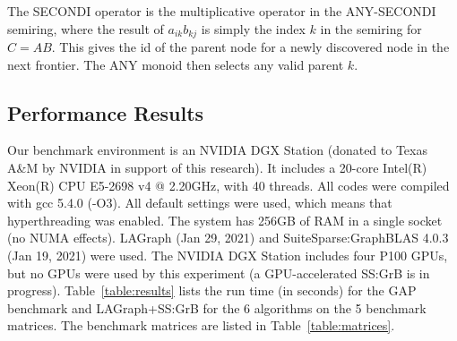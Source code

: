 The SECONDI operator is the multiplicative operator in the ANY-SECONDI
semiring, where the result of $a_{ik} b_{kj}$ is simply the index $k$ in the
semiring for $C=AB$.  This gives the id of the parent node for a newly
discovered node in the next frontier.  The ANY monoid then selects any valid
parent $k$.

\subsection{Performance Results}

Our benchmark environment is an NVIDIA DGX Station (donated to Texas A\&M by
NVIDIA in support of this research).  It includes a 20-core Intel(R) Xeon(R)
CPU E5-2698 v4 @ 2.20GHz, with 40 threads.  All codes were compiled with gcc
5.4.0 (-O3).  All default settings were used, which means that hyperthreading
was enabled.  The system has 256GB of RAM in a single socket (no NUMA effects).
LAGraph (Jan 29, 2021) and SuiteSparse:GraphBLAS 4.0.3 (Jan 19, 2021) were
used.  The NVIDIA DGX Station includes four P100 GPUs, but no GPUs were used by
this experiment (a GPU-accelerated SS:GrB is in progress).
Table~\ref{table:results} lists the run time (in seconds) for the GAP benchmark
and LAGraph+SS:GrB for the 6 algorithms on the 5 benchmark matrices.
The benchmark matrices are listed in Table~\ref{table:matrices}.

